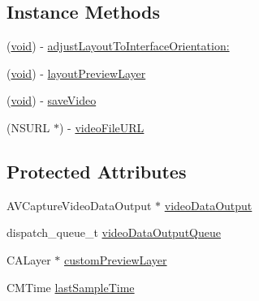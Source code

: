 \subsection*{Instance Methods}
\begin{DoxyCompactItemize}
\item 
(\hyperlink{legacy_8hpp_a8bb47f092d473522721002c86c13b94e}{void}) -\/ \hyperlink{interfaceCvVideoCamera_a19344be0c1823dd18dea70f5ae1c2f0d}{adjust\-Layout\-To\-Interface\-Orientation\-:}
\item 
(\hyperlink{legacy_8hpp_a8bb47f092d473522721002c86c13b94e}{void}) -\/ \hyperlink{interfaceCvVideoCamera_a6f29071e9826552f1c450df2d5d0d756}{layout\-Preview\-Layer}
\item 
(\hyperlink{legacy_8hpp_a8bb47f092d473522721002c86c13b94e}{void}) -\/ \hyperlink{interfaceCvVideoCamera_a11e364063fcfed60e82995cab3eb1a1b}{save\-Video}
\item 
(N\-S\-U\-R\-L $\ast$) -\/ \hyperlink{interfaceCvVideoCamera_a9f7b8533943deeb5fd6122a4900fb2aa}{video\-File\-U\-R\-L}
\end{DoxyCompactItemize}
\subsection*{Protected Attributes}
\begin{DoxyCompactItemize}
\item 
A\-V\-Capture\-Video\-Data\-Output $\ast$ \hyperlink{interfaceCvVideoCamera_ab0f5857858359cba2580c21de5bc19dd}{video\-Data\-Output}
\item 
dispatch\-\_\-queue\-\_\-t \hyperlink{interfaceCvVideoCamera_a4b2bec06f6cd2ee1002dea79d95030df}{video\-Data\-Output\-Queue}
\item 
C\-A\-Layer $\ast$ \hyperlink{interfaceCvVideoCamera_a46d53b968c51c20e96ef8947444b726d}{custom\-Preview\-Layer}
\item 
C\-M\-Time \hyperlink{interfaceCvVideoCamera_a1730b56eb3f27f253fb609e368d11945}{last\-Sample\-Time}
\end{DoxyCompactItemize}
